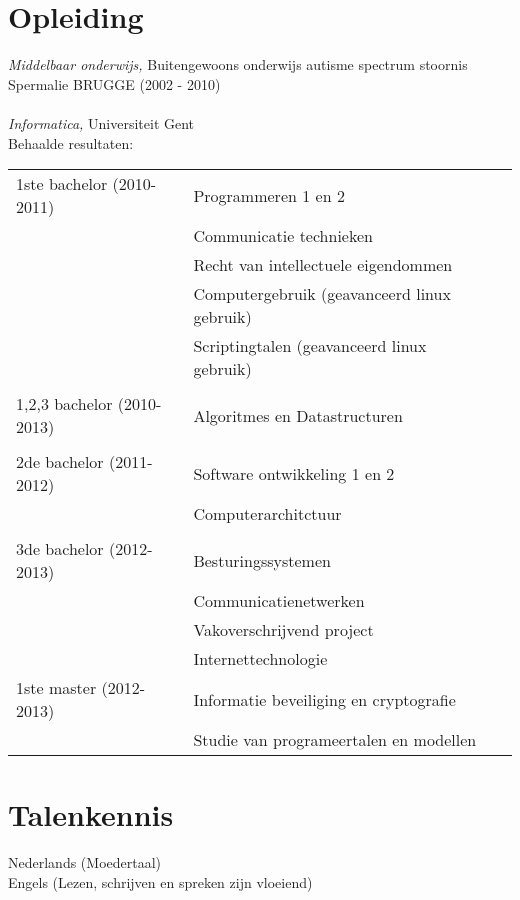 \documentclass[margin, 10pt]{res} %
\begin{document}
\begin{resume}
\section{Opleiding}

{\sl Middelbaar onderwijs,} Buitengewoons onderwijs autisme spectrum stoornis \\
Spermalie BRUGGE (2002 - 2010)
\\ \\
{\sl Informatica,} Universiteit Gent \\
Behaalde resultaten:
\begin{tabular}{l l l}
1ste bachelor (2010-2011) & Programmeren 1 en 2 \\
						  & Communicatie technieken \\
						  & Recht van intellectuele eigendommen \\
						  & Computergebruik (geavanceerd linux gebruik) \\
						  & Scriptingtalen (geavanceerd linux gebruik) \\
\\					 
1,2,3 bachelor (2010-2013) &  Algoritmes en Datastructuren \\
\\
2de bachelor (2011-2012) & Software ontwikkeling 1 en 2 \\
		                 & Computerarchitctuur \\
\\	
3de bachelor (2012-2013) & Besturingssystemen \\
						 & Communicatienetwerken \\
						 & Vakoverschrijvend project \\
						 & Internettechnologie \\
1ste master (2012-2013)  & Informatie beveiliging en cryptografie \\
						 & Studie van programeertalen en modellen \\
\end{tabular}
\section{Talenkennis}
Nederlands (Moedertaal) \\ 
Engels (Lezen, schrijven en spreken zijn vloeiend)


\end{resume}
\end{document}
